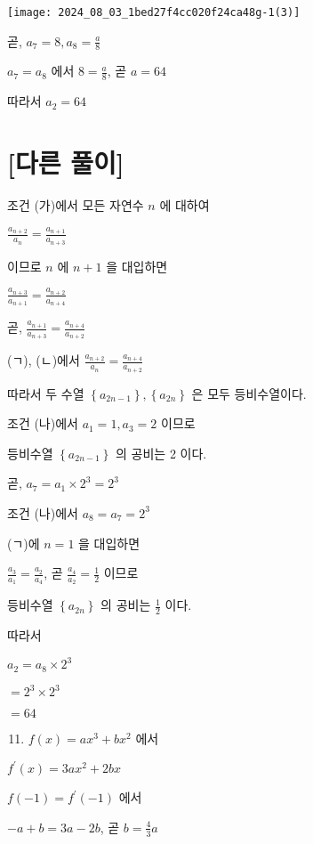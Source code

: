 \documentclass[10pt]{article}
\begin{document}
\begin{center}
\texttt{[image: 2024\_08\_03\_1bed27f4cc020f24ca48g-1(3)]}
\end{center}

곧, \(a_{7}=8, a_{8}=\frac{a}{8}\)

\(a_{7}=a_{8}\) 에서 \(8=\frac{a}{8}\), 곧 \(a=64\)

따라서 \(a_{2}=64\)

\section*{[다른 풀이]}
조건 (가)에서 모든 자연수 \(n\) 에 대하여

\(\frac{a_{n+2}}{a_{n}}=\frac{a_{n+1}}{a_{n+3}}\)

이므로 \(n\) 에 \(n+1\) 을 대입하면

\(\frac{a_{n+3}}{a_{n+1}}=\frac{a_{n+2}}{a_{n+4}}\)

곧, \(\frac{a_{n+1}}{a_{n+3}}=\frac{a_{n+4}}{a_{n+2}}\)

(ㄱ), (ㄴ)에서 \(\frac{a_{n+2}}{a_{n}}=\frac{a_{n+4}}{a_{n+2}}\)

따라서 두 수열 \(\left\{a_{2 n-1}\right\},\left\{a_{2 n}\right\}\) 은 모두 등비수열이다.

조건 (나)에서 \(a_{1}=1, a_{3}=2\) 이므로

등비수열 \(\left\{a_{2 n-1}\right\}\) 의 공비는 2 이다.

곧, \(a_{7}=a_{1} \times 2^{3}=2^{3}\)

조건 (나)에서 \(a_{8}=a_{7}=2^{3}\)

(ㄱ)에 \(n=1\) 을 대입하면

\(\frac{a_{3}}{a_{1}}=\frac{a_{2}}{a_{4}}\), 곧 \(\frac{a_{4}}{a_{2}}=\frac{1}{2}\) 이므로

등비수열 \(\left\{a_{2 n}\right\}\) 의 공비는 \(\frac{1}{2}\) 이다.

따라서

\(a_{2}=a_{8} \times 2^{3}\)

\(=2^{3} \times 2^{3}\)

\(=64\)

\begin{enumerate}
  \setcounter{enumi}{10}
  \item \(f(x)=a x^{3}+b x^{2}\) 에서
\end{enumerate}

\(f^{\prime}(x)=3 a x^{2}+2 b x\)

\(f(-1)=f^{\prime}(-1)\) 에서

\(-a+b=3 a-2 b\), 곧 \(b=\frac{4}{3} a\)
\end{document}
